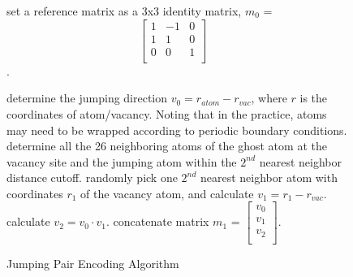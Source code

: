 \begin{figure}[!htb]
  \centering
  \begin{minipage}{.7\linewidth}
    \begin{algorithm}[H]
      \caption{Jumping Pair Encoding Algorithm}\label{algo:encode}
      \begin{algorithmic}[1]
        \State set a reference matrix as a 3x3 identity matrix, $m_0$ = $$\begin{bmatrix} 1 & -1 & 0 \\1 & 1 & 0 \\0 & 0 & 1 \\\end{bmatrix}\quad$$.
        
        \State determine the jumping direction $v_0 = r_{atom} - r_{vac}$, where $r$ is the coordinates of atom/vacancy. Noting that in the practice, atoms may need to be wrapped according to periodic boundary conditions.
        \State determine all the 26 neighboring atoms of the ghost atom at the vacancy site and the jumping atom within the $2^{nd}$ nearest neighbor distance cutoff.
        \State randomly pick one $2^{nd}$ nearest neighbor atom with coordinates $r_1$ of the vacancy atom, and calculate $v_1 = r_{1} - r_{vac}$.
        \State calculate $v_2 = v_0 \cdot v_1$.
        \State concatenate matrix $m_1$ = $\begin{bmatrix} v_0 \\v_1 \\v_2 \\\end{bmatrix}$.
        

\end{algorithmic}
\end{algorithm}
\end{minipage}
\end{figure}
